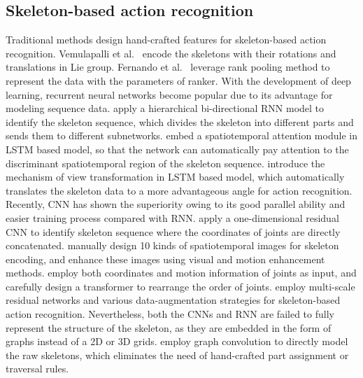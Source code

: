 \documentclass[10pt,twocolumn,letterpaper]{article}
\begin{document}
	\subsection{Skeleton-based action recognition}
    Traditional methods design hand-crafted features for skeleton-based action recognition\cite{vemulapalli_human_2014,fernando_modeling_2015}. Vemulapalli et al.~\cite{vemulapalli_human_2014} encode the skeletons with their rotations and translations in Lie group. Fernando et al.~\cite{fernando_modeling_2015} leverage rank pooling method to represent the data with the parameters of ranker.
    With the development of deep learning, recurrent neural networks become popular due to its advantage for modeling sequence data. \cite{du_hierarchical_2015} apply a hierarchical bi-directional RNN model to identify the skeleton sequence, which divides the skeleton into different parts and sends them to different subnetworks. \cite{song_end--end_2017} embed a spatiotemporal attention module in LSTM based model, so that the network can automatically pay attention to the discriminant spatiotemporal region of the skeleton sequence. \cite{zhang_view_2017} introduce the mechanism of view transformation in LSTM based model, which automatically translates the skeleton data to a more advantageous angle for action recognition.
    Recently, CNN has shown the superiority owing to its good parallel ability and easier training process compared with RNN. \cite{kim_interpretable_2017} apply a one-dimensional residual CNN to identify skeleton sequence where the coordinates of joints are directly concatenated. \cite{liu_enhanced_2017} manually design 10 kinds of spatiotemporal images for skeleton encoding, and enhance these images using visual and motion enhancement methods.
    \cite{liu_two-stream_2017} employ both coordinates and motion information of joints as input, and carefully design a transformer to rearrange the order of joints.
    \cite{li_skeleton_2017} employ multi-scale residual networks and various data-augmentation strategies for skeleton-based action recognition.
    Nevertheless, both the CNNs and RNN are failed to fully represent the structure of the skeleton, as they are embedded in the form of graphs instead of a 2D or 3D grids. \cite{yan_spatial_2018} employ graph convolution to directly model the raw skeletons, which eliminates the need of hand-crafted part assignment or traversal rules. 
\end{document}
